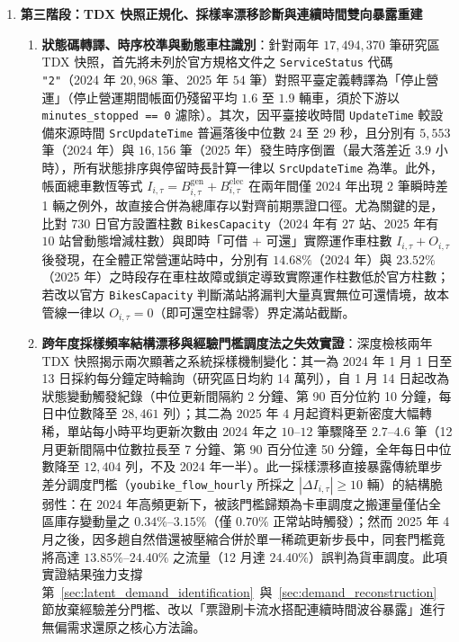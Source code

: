 \begin{enumerate}
    \item \textbf{第三階段：TDX 快照正規化、採樣率漂移診斷與連續時間雙向暴露重建}
    \begin{enumerate}[label = \textbullet]
        \item \textbf{狀態碼轉譯、時序校準與動態車柱識別}：針對兩年 $17{,}494{,}370$ 筆研究區 TDX 快照，首先將未列於官方規格文件之 \texttt{ServiceStatus} 代碼 \texttt{"2"}（2024 年 $20{,}968$ 筆、2025 年 $54$ 筆）對照平臺定義轉譯為「停止營運」（停止營運期間帳面仍殘留平均 $1.6$ 至 $1.9$ 輛車，須於下游以 \texttt{minutes\_stopped == 0} 濾除）。其次，因平臺接收時間 \texttt{UpdateTime} 較設備來源時間 \texttt{SrcUpdateTime} 普遍落後中位數 $24$ 至 $29$ 秒，且分別有 $5{,}553$ 筆（2024 年）與 $16{,}156$ 筆（2025 年）發生時序倒置（最大落差近 $3.9$ 小時），所有狀態排序與停留時長計算一律以 \texttt{SrcUpdateTime} 為準。此外，帳面總車數恆等式 $I_{i,\tau} = B^{\text{gen}}_{i,\tau} + B^{\text{elec}}_{i,\tau}$ 在兩年間僅 2024 年出現 $2$ 筆瞬時差 1 輛之例外，故直接合併為總庫存以對齊前期票證口徑。尤為關鍵的是，比對 730 日官方設置柱數 \texttt{BikesCapacity}（2024 年有 $27$ 站、2025 年有 $10$ 站曾動態增減柱數）與即時「可借 $+$ 可還」實際運作車柱數 $I_{i,\tau} + O_{i,\tau}$ 後發現，在全體正常營運站時中，分別有 $14.68\%$（2024 年）與 $23.52\%$（2025 年）之時段存在車柱故障或鎖定導致實際運作柱數低於官方柱數；若改以官方 \texttt{BikesCapacity} 判斷滿站將漏判大量真實無位可還情境，故本管線一律以 $O_{i,\tau} = 0$（即可還空柱歸零）界定滿站截斷。
        \item \textbf{跨年度採樣頻率結構漂移與經驗門檻調度法之失效實證}：深度檢核兩年 TDX 快照揭示兩次顯著之系統採樣機制變化：其一為 2024 年 1 月 1 日至 13 日採約每分鐘定時輪詢（研究區日均約 14 萬列），自 1 月 14 日起改為狀態變動觸發紀錄（中位更新間隔約 2 分鐘、第 90 百分位約 10 分鐘，每日中位數降至 $28{,}461$ 列）；其二為 2025 年 4 月起資料更新密度大幅轉稀，單站每小時平均更新次數由 2024 年之 $10\text{--}12$ 筆驟降至 $2.7\text{--}4.6$ 筆（12 月更新間隔中位數拉長至 7 分鐘、第 90 百分位達 50 分鐘，全年每日中位數降至 $12{,}404$ 列，不及 2024 年一半）。此一採樣漂移直接暴露傳統單步差分調度門檻（\texttt{youbike\_flow\_hourly} 所採之 $|\Delta I_{i,\tau}| \ge 10$ 輛）的結構脆弱性：在 2024 年高頻更新下，被該門檻歸類為卡車調度之搬運量僅佔全區庫存變動量之 $0.34\%\text{--}3.15\%$（僅 $0.70\%$ 正常站時觸發）；然而 2025 年 4 月之後，因多趟自然借還被壓縮合併於單一稀疏更新步長中，同套門檻竟將高達 $13.85\%\text{--}24.40\%$ 之流量（12 月達 $24.40\%$）誤判為貨車調度。此項實證結果強力支撐第~\ref{sec:latent_demand_identification}~與~\ref{sec:demand_reconstruction}~節放棄經驗差分門檻、改以「票證刷卡流水搭配連續時間波谷暴露」進行無偏需求還原之核心方法論。

\end{enumerate}
\end{enumerate}
